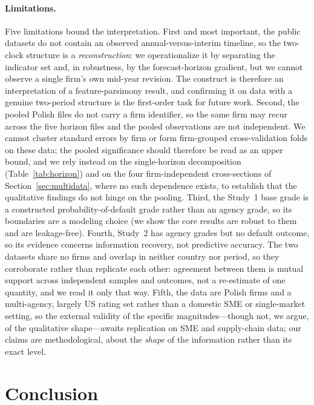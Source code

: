 \documentclass[pdflatex,sn-mathphys-ay]{sn-jnl}
\begin{document}
\paragraph{Limitations.} Five limitations bound the interpretation. First and most important, the
public datasets do not contain an observed annual-versus-interim timeline, so the two-clock structure is
a \emph{reconstruction}: we operationalize it by separating the indicator set and, in robustness, by the
forecast-horizon gradient, but we cannot observe a single firm's own mid-year revision. The construct is
therefore an interpretation of a feature-parsimony result, and confirming it on data with a genuine
two-period structure is the first-order task for future work. Second, the pooled Polish files do not
carry a firm identifier, so the same firm may recur across the five horizon files and the pooled
observations are not independent. We cannot cluster standard errors by firm or form firm-grouped
cross-validation folds on these data; the pooled significance should therefore be read as an upper
bound, and we rely instead on the single-horizon decomposition (Table~\ref{tab:horizon}) and on the
four firm-independent cross-sections of Section~\ref{sec:multidata}, where no such dependence exists, to
establish that the qualitative findings do not hinge on the pooling. Third, the Study~1 base grade is a
constructed probability-of-default grade rather than an agency grade, so its boundaries are a modeling
choice (we show the core results are robust to them and are leakage-free). Fourth, Study~2 has agency
grades but no default outcome, so its evidence concerns information recovery, not predictive accuracy.
The two datasets share no firms and overlap in neither country nor period, so they corroborate rather
than replicate each other: agreement between them is mutual support across independent samples and
outcomes, not a re-estimate of one quantity, and we read it only that way. Fifth, the data are Polish firms and a
multi-agency, largely US rating set rather than a domestic SME or single-market setting, so the external
validity of the specific magnitudes---though not, we argue, of the qualitative shape---awaits replication
on SME and supply-chain data; our claims are methodological, about the \emph{shape} of the information
rather than its exact level.

\section{Conclusion}\label{sec:conclusion}
\end{document}
